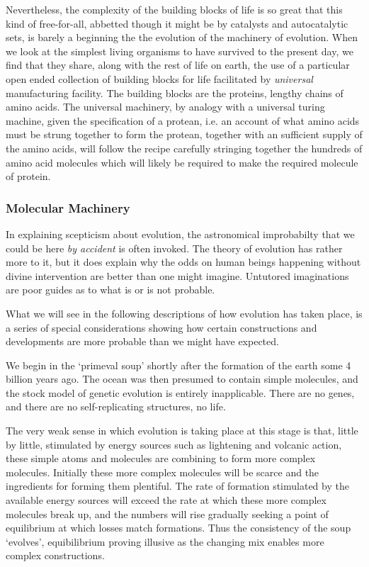 \documentclass[10pt,titlepage]{article}
\begin{document}
  Nevertheless, the complexity of the building blocks of life is so great that this kind of free-for-all, abbetted though it might be by catalysts and autocatalytic sets, is barely a beginning the the evolution of the machinery of evolution.
  When we look at the simplest living organisms to have survived to the present day, we find that they share, along with the rest of life on earth, the use of a particular open ended collection of building blocks for life facilitated by \emph{universal} manufacturing facility.
  The building blocks are the proteins, lengthy chains of amino acids.
  The universal machinery, by analogy with a universal turing machine, given the specification of a protean, i.e. an account of what amino acids must be strung together to form the protean, together with an sufficient supply of the amino acids, will follow the recipe carefully stringing together the hundreds of amino acid molecules which will likely be required to make the required molecule of protein.

  \subsubsection {Molecular Machinery}

    In explaining scepticism about evolution, the astronomical improbabilty that we could be here \emph{by accident} is often invoked.
    The theory of evolution has rather more to it, but it does explain why the odds on human beings happening without divine intervention are better than one might imagine.
    Untutored imaginations are poor guides as to what is or is not probable.
    
    What we will see in the following descriptions of how evolution has taken place, is a series of special considerations showing how certain constructions and developments are more probable than we might have expected.

    We begin in the `primeval soup' shortly after the formation of the earth some 4 billion years ago.
    The ocean was then presumed to contain simple molecules, and the stock model of genetic evolution is entirely inapplicable.
    There are no genes, and there are no self-replicating structures, no life.
    
    The very weak sense in which evolution is taking place at this stage is that, little by little, stimulated by energy sources such as lightening and volcanic action, these simple atoms and molecules are combining to form more complex molecules.
    Initially these more complex molecules will be scarce and the ingredients for forming them plentiful.
    The rate of formation stimulated by the available energy sources will exceed the rate at which these more complex molecules break up, and the numbers will rise gradually seeking a point of equilibrium at which losses match formations.
    Thus the consistency of the soup `evolves', equibilibrium proving illusive as the changing mix enables more complex constructions.
\end{document}

